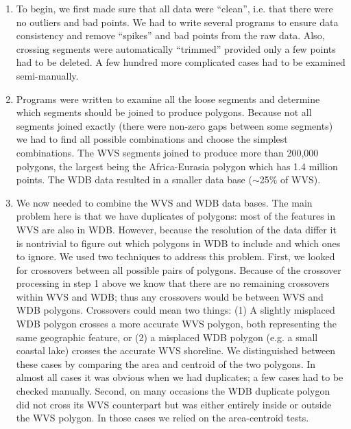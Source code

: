 \begin{enumerate} 

\item To begin, we first made sure that all data were ``clean'',
i.e. that there were no outliers and bad points.  We had to
write several programs to ensure data consistency and remove
``spikes'' and bad points from the raw data.  Also, crossing
segments were automatically ``trimmed'' provided only
a few points had to be deleted.  A few hundred more complicated
cases had to be examined semi-manually.

\item Programs were written to examine all the loose segments
and determine which segments should be joined to produce
polygons.  Because not all segments joined exactly (there were
non-zero gaps between some segments) we had to find all possible
combinations and choose the simplest combinations.
The WVS segments joined to produce more than 200,000 polygons,
the largest being the Africa-Eurasia polygon which has 1.4
million points.  The WDB data resulted in a smaller data base
($\sim$25\% of WVS).

\item We now needed to combine the WVS and WDB data bases.
The main problem here is that we have duplicates of polygons:
most of the features in WVS are also in WDB.  However, because
the resolution of the data differ it is nontrivial to figure
out which polygons in WDB to include and which ones to ignore.
We used two techniques to address this problem.
First, we looked for crossovers between all possible pairs of
polygons.  Because of the crossover processing in step 1 above we know
that there are no remaining crossovers within WVS and WDB; thus
any crossovers would be between WVS and WDB polygons.  Crossovers
could mean two things: (1) A slightly misplaced WDB polygon
crosses a more accurate WVS polygon, both representing the same
geographic feature, or (2) a misplaced WDB polygon (e.g. a small
coastal lake) crosses the accurate WVS shoreline.  We distinguished
between these cases by comparing the area and centroid of the two
polygons.  In almost all cases it was obvious when we had
duplicates; a few cases had to be checked manually.  Second,
on many occasions the WDB duplicate polygon did not cross its
WVS counterpart but was either entirely inside or outside the
WVS polygon.  In those cases we relied on the area-centroid tests.


\end{enumerate}
